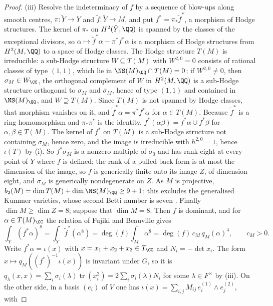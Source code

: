 \begin{proof}
(iii) Resolve the indeterminacy of $f$ by a sequence of blow-ups along
smooth centres, $\pi\colon\tilde{Y}\to Y$ and $\tilde{f}\colon\tilde{Y}\to M$,
and put $f^{*}=\pi_{*}\tilde{f}^{*}$, a morphism of Hodge structures. The
kernel of $\pi_{*}$ on $H^{2}(\tilde{Y},\QQ)$ is spanned by the classes of
the exceptional divisors, so $\alpha\mapsto\tilde{f}^{*}\alpha-
\pi^{*}f^{*}\alpha$ is a morphism of Hodge structures from $H^{2}(M,\QQ)$ to a
space of Hodge classes. The Hodge structure $T(M)$ is irreducible: a
sub-Hodge structure $W\subseteq T(M)$ with $W^{2,0}=0$ consists of rational
classes of type $(1,1)$, which lie in $\NS(M)_{\QQ}\cap T(M)=0$; if
$W^{2,0}\ne0$, then $\sigma_{M}\in W_{\CC}$, the orthogonal complement of $W$
in $H^{2}(M,\QQ)$ is a sub-Hodge structure orthogonal to $\sigma_{M}$ and
$\bar{\sigma}_{M}$, hence of type $(1,1)$ and contained in $\NS(M)_{\QQ}$,
and $W\supseteq T(M)$. Since $T(M)$ is not spanned by Hodge classes, that
morphism vanishes on it, and $\tilde{f}^{*}\alpha=\pi^{*}f^{*}\alpha$ for
$\alpha\in T(M)$. Because $\tilde{f}^{*}$ is a ring homomorphism and
$\pi_{*}\pi^{*}$ is the identity, $f^{*}(\alpha\beta)=f^{*}\alpha\cup
f^{*}\beta$ for $\alpha,\beta\in T(M)$. The kernel of $f^{*}$ on $T(M)$ is a
sub-Hodge structure not containing $\sigma_{M}$, hence zero, and the image is
irreducible with $h^{2,0}=1$, hence $\iota(T)$ by (i). So $f^{*}\sigma_{M}$ is
a nonzero multiple of $\sigma_{0}$ and has rank eight at every point of $Y$
where $f$ is defined; the rank of a pulled-back form is at most the dimension
of the image, so $f$ is generically finite onto its image $Z$, of dimension
eight, and $\sigma_{M}$ is generically nondegenerate on $Z$. As $M$ is
projective, $b_{2}(M)=\dim T(M)+\dim\NS(M)_{\QQ}\ge9+1$; this excludes the
generalised Kummer varieties, whose second Betti number is seven
\cite{Bea83}. Finally $\dim M\ge\dim Z=8$; suppose that $\dim M=8$. Then
$f$ is dominant, and for $\alpha\in T(M)_{\CC}$ the relation of Fujiki and
Beauville \cite{Bea83,Fuj87} gives
\[
  \int_{Y}(f^{*}\alpha)^{8}=\int_{\tilde{Y}}\tilde{f}^{*}(\alpha^{8})
  =\deg(f)\int_{M}\alpha^{8}=\deg(f)\,c_{M}\,q_{M}(\alpha)^{4},
  \qquad c_{M}>0 .
\]
Write $f^{*}\alpha=\iota(x)$ with $x=x_{1}+x_{2}+x_{3}\in T_{\CC}$ and
$N_{i}=-\det x_{i}$. The form $x\mapsto q_{M}((f^{*})^{-1}\iota(x))$ is
invariant under $G$, so it is $q_{\lambda}(x,x)=
\sum_{i}\sigma_{i}(\lambda)\operatorname{tr}(x_{i}^{2})=
2\sum_{i}\sigma_{i}(\lambda)N_{i}$ for some $\lambda\in F^{\times}$ by
(iii). On the other side, in a basis $(e_{i})$ of
$V$ one has $\iota(x)=\sum_{i,j}M_{ij}\,e_{i}^{(1)}\wedge e_{j}^{(2)}$, with

\end{proof}
